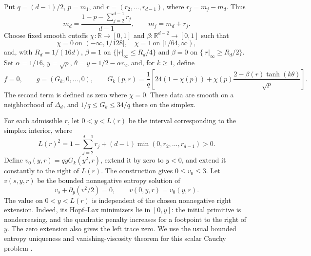 \documentclass[11pt]{article}
\newcommand{\R}{\mathbb R}
\begin{document}
Put $q=(d-1)/2$, $p=m_1$, and $r=(r_2,\ldots,r_{d-1})$, where $r_j=m_j-m_d$. Thus
\[
 m_d=\frac{1-p-\sum_{j=2}^{d-1}r_j}{d-1},\qquad m_j=m_d+r_j.
\]
Choose fixed smooth cutoffs $\chi:\R\to[0,1]$ and $\beta:\R^{d-2}\to[0,1]$ such that
\[
 \chi=0\ \text{on }(-\infty,1/128],\quad \chi=1\ \text{on }[1/64,\infty),
\]
and, with $R_d=1/(16d)$, $\beta=1$ on $\{|r|_\infty\le R_d/4\}$ and $\beta=0$ on $\{|r|_\infty\ge R_d/2\}$. Set $\alpha=1/16$, $y=\sqrt p$, $\theta=y-1/2-\alpha r_2$, and, for $k\ge1$, define
\begin{equation}\label{data}
 f=0,\qquad g=(G_k,0,\ldots,0),\qquad
 G_k(p,r)=\frac1q\left[24(1-\chi(p))+\chi(p)\frac{2-\beta(r)\tanh(k\theta)}{\sqrt p}\right].
\end{equation}
The second term is defined as zero where $\chi=0$. These data are smooth on a neighborhood of $\Delta_d$, and $1/q\le G_k\le34/q$ there on the simplex.

For each admissible $r$, let $0<y<L(r)$ be the interval corresponding to the simplex interior, where
\[
 L(r)^2=1-\sum_{j=2}^{d-1}r_j+(d-1)\min(0,r_2,\ldots,r_{d-1})>0.
\]
Define $v_0(y,r)=qyG_k(y^2,r)$, extend it by zero to $y<0$, and extend it constantly to the right of $L(r)$. The construction gives $0\le v_0\le3$. Let $v(s,y,r)$ be the bounded nonnegative entropy solution of
\begin{equation}\label{burgers}
 v_s+\partial_y(v^2/2)=0,\qquad v(0,y,r)=v_0(y,r).
\end{equation}
The value on $0<y<L(r)$ is independent of the chosen nonnegative right extension. Indeed, its Hopf--Lax minimizers lie in $[0,y]$: the initial primitive is nondecreasing, and the quadratic penalty increases for a footpoint to the right of $y$. The zero extension also gives the left trace zero. We use the usual bounded entropy uniqueness and vanishing-viscosity theorem for this scalar Cauchy problem \cite{Kru}.
\end{document}
